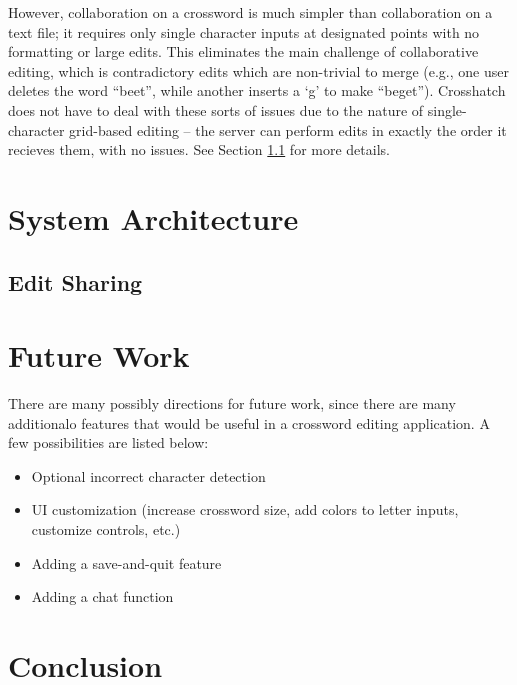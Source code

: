 \documentclass{article}
\begin{document}
However, collaboration on a crossword is much simpler than collaboration on a text file; it requires only
single character inputs at designated points with no formatting or large edits. This eliminates the main challenge of collaborative editing, which is contradictory edits which are non-trivial to merge (e.g., one user deletes the word ``beet'', while another inserts a `g' to make ``beget''). Crosshatch does not have to deal with these sorts of issues due to the nature of single-character grid-based editing -- the server can perform edits in exactly the order it recieves them, with no issues. See Section \ref{editsharing} for more details.

\section{System Architecture}
\subsection{Edit Sharing}
\label{editsharing}

\section{Future Work}
There are many possibly directions for future work, since there are many additionalo features that would be useful in a crossword editing application. A few possibilities are listed below:
\begin{itemize}
	\item Optional incorrect character detection
  \item UI customization (increase crossword size, add colors to letter inputs, customize controls, etc.)
	\item Adding a save-and-quit feature
	\item Adding a chat function
\end{itemize}

\section{Conclusion}

\newpage


\end{document}
